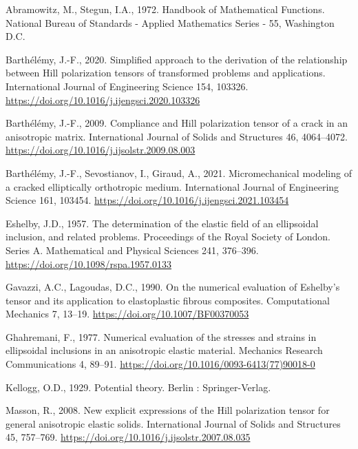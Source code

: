 \documentclass[
  letterpaper,
  DIV=11,
  numbers=noendperiod]{scrreprt}
\newlength{\cslhangindent}
\newlength{\cslentryspacingunit} %
\newenvironment{CSLReferences}[2] %
 {%
  \setlength{\parindent}{0pt}
  \ifodd #1
  \let\oldpar\par
  \def\par{\hangindent=\cslhangindent\oldpar}
  \fi
  \setlength{\parskip}{#2\cslentryspacingunit}
 }%
 {}
\begin{document}
\hypertarget{refs}{}
\begin{CSLReferences}{1}{0}
\leavevmode{}%
Abramowitz, M., Stegun, I.A., 1972. Handbook of {Mathematical
Functions}. {National Bureau of Standards - Applied Mathematics Series -
55}, {Washington D.C.}

\leavevmode{}%
Barthélémy, J.-F., 2020. Simplified approach to the derivation of the
relationship between {Hill} polarization tensors of transformed problems
and applications. International Journal of Engineering Science 154,
103326. \url{https://doi.org/10.1016/j.ijengsci.2020.103326}

\leavevmode{}%
Barthélémy, J.-F., 2009. Compliance and {Hill} polarization tensor of a
crack in an anisotropic matrix. International Journal of Solids and
Structures 46, 4064--4072.
\url{https://doi.org/10.1016/j.ijsolstr.2009.08.003}

\leavevmode{}%
Barthélémy, J.-F., Sevostianov, I., Giraud, A., 2021. Micromechanical
modeling of a cracked elliptically orthotropic medium. International
Journal of Engineering Science 161, 103454.
\url{https://doi.org/10.1016/j.ijengsci.2021.103454}

\leavevmode{}%
Eshelby, J.D., 1957. The determination of the elastic field of an
ellipsoidal inclusion, and related problems. Proceedings of the Royal
Society of London. Series A. Mathematical and Physical Sciences 241,
376--396. \url{https://doi.org/10.1098/rspa.1957.0133}

\leavevmode{}%
Gavazzi, A.C., Lagoudas, D.C., 1990. On the numerical evaluation of
{Eshelby}'s tensor and its application to elastoplastic fibrous
composites. Computational Mechanics 7, 13--19.
\url{https://doi.org/10.1007/BF00370053}

\leavevmode{}%
Ghahremani, F., 1977. Numerical evaluation of the stresses and strains
in ellipsoidal inclusions in an anisotropic elastic material. Mechanics
Research Communications 4, 89--91.
\url{https://doi.org/10.1016/0093-6413(77)90018-0}

\leavevmode{}%
Kellogg, O.D., 1929. Potential theory. {Berlin : Springer-Verlag}.

\leavevmode{}%
Masson, R., 2008. New explicit expressions of the {Hill} polarization
tensor for general anisotropic elastic solids. International Journal of
Solids and Structures 45, 757--769.
\url{https://doi.org/10.1016/j.ijsolstr.2007.08.035}


\end{CSLReferences}
\end{document}
